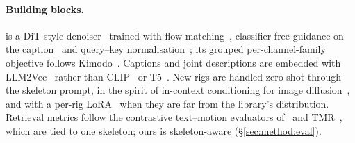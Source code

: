 \paragraph{Building blocks.} \method{} is a DiT-style
denoiser~\citep{peebles2023dit} trained with flow matching~\citep{lipman2023flow,liu2023rectified},
classifier-free guidance on the caption~\citep{ho2022cfg} and query--key
normalisation~\citep{dehghani2023vit22b}; its grouped per-channel-family objective follows
Kimodo~\citep{rempe2026kimodo}. Captions and joint descriptions are embedded with
LLM2Vec~\citep{behnamghader2024llm2vec} rather than CLIP~\citep{radford2021clip} or
T5~\citep{raffel2020t5}. New rigs are handled zero-shot through the skeleton prompt, in the spirit of
in-context conditioning for image diffusion~\citep{wang2023promptdiffusion}, and with a per-rig
LoRA~\citep{hu2022lora} when they are far from the library's distribution. Retrieval metrics follow the contrastive text--motion evaluators
of~\citet{guo2022generating} and TMR~\citep{petrovich2023tmr}, which are tied to one skeleton; ours
is skeleton-aware (\S\ref{sec:method:eval}).
